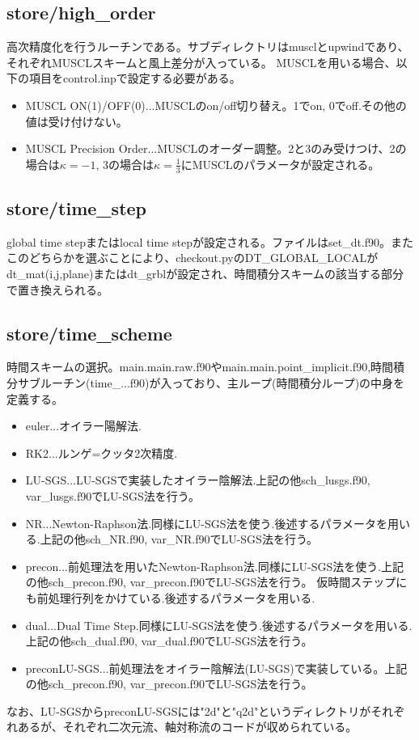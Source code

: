 \documentclass{jsarticle}
\begin{document}
\subsection{store/high\_order}%
高次精度化を行うルーチンである。サブディレクトリはmusclとupwindであり、それぞれMUSCLスキームと風上差分が入っている。
MUSCLを用いる場合、以下の項目をcontrol.inpで設定する必要がある。
\begin{itemize}
\item MUSCL ON(1)/OFF(0)...MUSCLのon/off切り替え。1でon, 0でoff.その他の値は受け付けない。
\item MUSCL Precision Order...MUSCLのオーダー調整。2と3のみ受けつけ、2の場合は$\kappa =-1$, 3の場合は$\kappa=\frac 1 3$にMUSCLのパラメータが設定される。
\end{itemize}
\subsection{store/time\_step}%
global time stepまたはlocal time stepが設定される。ファイルはset\_dt.f90。またこのどちらかを選ぶことにより、checkout.pyのDT\_GLOBAL\_LOCALがdt\_mat(i,j,plane)またはdt\_grblが設定され、時間積分スキームの該当する部分で置き換えられる。
\subsection{store/time\_scheme}%
時間スキームの選択。main.main.raw.f90やmain.main.point\_implicit.f90,時間積分サブルーチン(time\_...f90)が入っており、主ループ(時間積分ループ)の中身を定義する。
\begin{itemize}
\item euler...オイラー陽解法.
\item RK2...ルンゲ=クッタ2次精度.
\item LU-SGS...LU-SGSで実装したオイラー陰解法.上記の他sch\_lusgs.f90, var\_lusgs.f90でLU-SGS法を行う。
\item NR...Newton-Raphson法.同様にLU-SGS法を使う.後述するパラメータを用いる.上記の他sch\_NR.f90, var\_NR.f90でLU-SGS法を行う。
\item precon...前処理法を用いたNewton-Raphson法.同様にLU-SGS法を使う.上記の他sch\_precon.f90, var\_precon.f90でLU-SGS法を行う。
仮時間ステップにも前処理行列をかけている.後述するパラメータを用いる.
\item dual...Dual Time Step.同様にLU-SGS法を使う.後述するパラメータを用いる.上記の他sch\_dual.f90, var\_dual.f90でLU-SGS法を行う。
\item preconLU-SGS...前処理法をオイラー陰解法(LU-SGS)で実装している。上記の他sch\_precon.f90, var\_precon.f90でLU-SGS法を行う。
\end{itemize}
なお、LU-SGSからpreconLU-SGSには"2d"と"q2d"というディレクトリがそれぞれあるが、それぞれ二次元流、軸対称流のコードが収められている。
\end{document}
